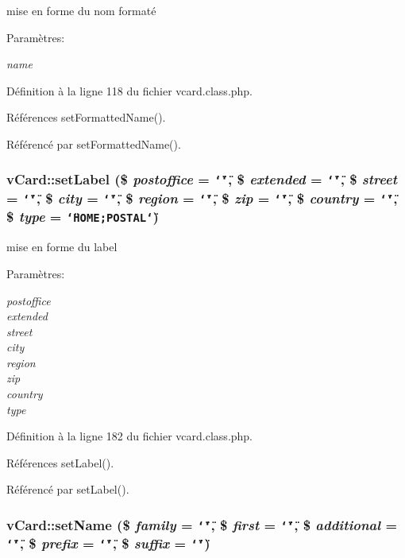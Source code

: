 mise en forme du nom format\'{e} 

\begin{Desc}
\item[Param\`{e}tres:]
\begin{description}
\item[{\em name}]\end{description}
\end{Desc}


D\'{e}finition \`{a} la ligne 118 du fichier vcard.class.php.

R\'{e}f\'{e}rences set\-Formatted\-Name().

R\'{e}f\'{e}renc\'{e} par set\-Formatted\-Name().\hypertarget{classvCard_a6}{
\subsubsection[setLabel]{\setlength{\rightskip}{0pt plus 5cm}v\-Card::set\-Label (\$ {\em postoffice} = {\tt \char`\"{}\char`\"{}}, \$ {\em extended} = {\tt \char`\"{}\char`\"{}}, \$ {\em street} = {\tt \char`\"{}\char`\"{}}, \$ {\em city} = {\tt \char`\"{}\char`\"{}}, \$ {\em region} = {\tt \char`\"{}\char`\"{}}, \$ {\em zip} = {\tt \char`\"{}\char`\"{}}, \$ {\em country} = {\tt \char`\"{}\char`\"{}}, \$ {\em type} = {\tt \char`\"{}HOME;POSTAL\char`\"{}})}}
\label{classvCard_a6}


mise en forme du label 

\begin{Desc}
\item[Param\`{e}tres:]
\begin{description}
\item[{\em postoffice}]\item[{\em extended}]\item[{\em street}]\item[{\em city}]\item[{\em region}]\item[{\em zip}]\item[{\em country}]\item[{\em type}]\end{description}
\end{Desc}


D\'{e}finition \`{a} la ligne 182 du fichier vcard.class.php.

R\'{e}f\'{e}rences set\-Label().

R\'{e}f\'{e}renc\'{e} par set\-Label().\hypertarget{classvCard_a3}{
\subsubsection[setName]{\setlength{\rightskip}{0pt plus 5cm}v\-Card::set\-Name (\$ {\em family} = {\tt \char`\"{}\char`\"{}}, \$ {\em first} = {\tt \char`\"{}\char`\"{}}, \$ {\em additional} = {\tt \char`\"{}\char`\"{}}, \$ {\em prefix} = {\tt \char`\"{}\char`\"{}}, \$ {\em suffix} = {\tt \char`\"{}\char`\"{}})}}
\label{classvCard_a3}


